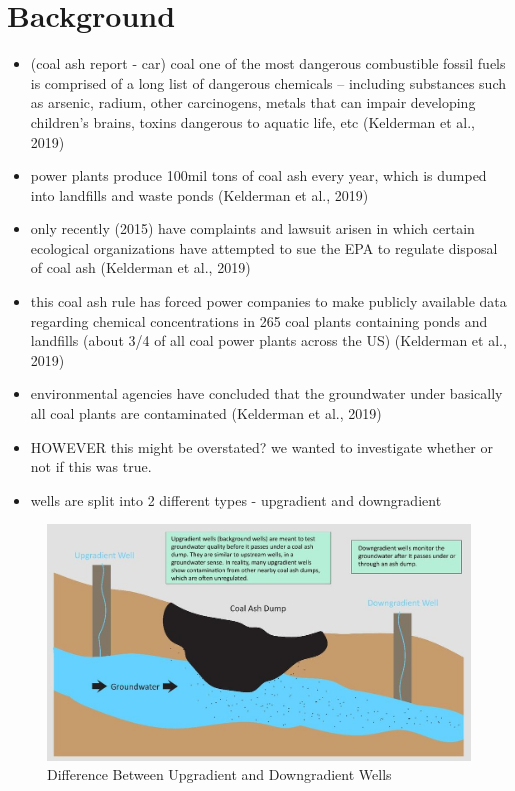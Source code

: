 \documentclass[12pt, twoside]{amherstthesis}
\begin{document}
\hypertarget{background}{%
\section{Background}\label{background}}
\begin{itemize}
\item
  (coal ash report - car) coal one of the most dangerous combustible fossil fuels is comprised of a long list of dangerous chemicals -- including substances such as arsenic, radium, other carcinogens, metals that can impair developing children's brains, toxins dangerous to aquatic life, etc (Kelderman et al., 2019)
\item
  power plants produce 100mil tons of coal ash every year, which is dumped into landfills and waste ponds (Kelderman et al., 2019)
\item
  only recently (2015) have complaints and lawsuit arisen in which certain ecological organizations have attempted to sue the EPA to regulate disposal of coal ash (Kelderman et al., 2019)
\item
  this coal ash rule has forced power companies to make publicly available data regarding chemical concentrations in 265 coal plants containing ponds and landfills (about 3/4 of all coal power plants across the US) (Kelderman et al., 2019)
\item
  environmental agencies have concluded that the groundwater under basically all coal plants are contaminated (Kelderman et al., 2019)
\item
  HOWEVER this might be overstated? we wanted to investigate whether or not if this was true.
\item
  wells are split into 2 different types - upgradient and downgradient
\end{itemize}
\begin{figure}

{\centering \includegraphics[width=1\linewidth]{figures/upgradientdowngradient} 

}

\caption{Difference Between Upgradient and Downgradient Wells}\label{fig:upgradientdowngradient}
\end{figure}
\end{document}
